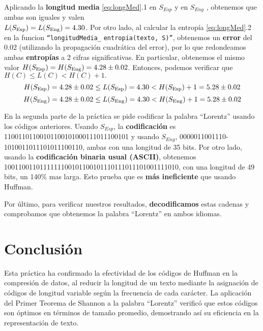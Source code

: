 \documentclass[a4paper]{article}
\begin{document}
\bigskip

Aplicando la \textbf{longitud media} \ref{eq:longMed}.1 en $S_{Esp}$ y en $S_{Eng}$ , obtenemos que ambas son iguales y valen \\ $ L(S_{\textup{Esp}}) = L(S_{\textup{Eng}}) = 4.30$. Por otro lado, al calcular la entropía \ref{eq:longMed}.2 en la funcion \texttt{``longitudMedia\_} \texttt{entropia(texto, S)''}, obtenemos un \textbf{error} del 0.02 (utilizando la propagación cuadrática del error), por lo que redondeamos ambas \textbf{entropías} a 2 cifras significativas. En particular, obtenemos el mismo valor $ H(S_{\textup{Esp}}) = H(S_{\textup{Eng}}) = 4.28 \pm 0.02$. Entonces, podemos verificar que  $H(C) \leq L(C) < H(C) + 1.$
\begin{equation*}
H(S_{\textup{Esp}}) = 4.28 \pm 0.02 \leq L(S_{\textup{Esp}}) = 4.30 < H(S_{\textup{Esp}}) + 1 = 5.28 \pm 0.02 
\end{equation*}
\begin{equation*}
H(S_{\textup{Eng}}) = 4.28 \pm 0.02 \leq L(S_{\textup{Eng}}) = 4.30 < H(S_{\textup{Eng}}) + 1 = 5.28 \pm 0.02
\end{equation*}

\bigskip

En la segunda parte de la práctica se pide codificar la palabra ``Lorentz'' usando los códigos anteriores. Usando $S_{Esp}$, la \textbf{codificación} es 11001101100101100101000111011100101 y usando $S_{Eng}$, 0000011001110- 1010011011101011100110, ambas con una longitud de 35 bits. Por otro lado, usando la \textbf{codificación binaria usual (ASCII)}, obtenemos 1001100110111111100101100101110111011101001111010, con una longitud de 49 bits, un 140\% mas larga. Esto prueba que es \textbf{más ineficiente} que usando Huffman. 

\bigskip

Por último, para verificar nuestros resultados, \textbf{decodificamos} estas cadenas y comprobamos que obtenemos la palabra ``Lorentz'' en ambos idiomas.


\section{Conclusión}

Esta práctica ha confirmado la efectividad de los códigos de Huffman en la compresión de datos, al reducir la longitud de un texto mediante la asignación de códigos de longitud variable según la frecuencia de cada carácter. La aplicación del Primer Teorema de Shannon a la palabra ``Lorentz'' verificó que estos códigos son óptimos en términos de tamaño promedio, demostrando así su eficiencia en la representación de texto. 
\end{document}
